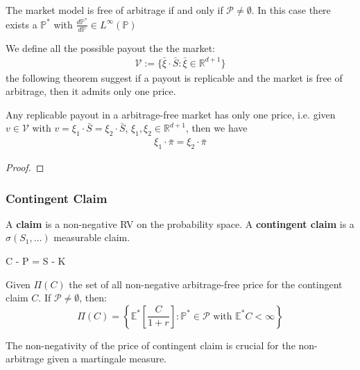\begin{theorem}
	The market model is free of arbitrage if and only if $\mathcal{P} \neq \emptyset$. In this case there exists a $\mathbb{P}^*$ with $\frac{d\mathbb{P}^*}{d\mathbb{P}} \in L^\infty(\mathbb{P})$
\end{theorem}

We define all the possible payout the the market:
\begin{align*}
	\mathcal{V}:= \{ \bar{\xi}\cdot \bar{S}: \bar{\xi} \in \mathbb{R}^{d +1}\}
\end{align*}
the following theorem suggest if a payout is replicable and the market is free of arbitrage, then it admits only one price.

\begin{theorem}
	Any replicable payout in a arbitrage-free market has only one price, i.e. given $v \in \mathcal{V}$ with $v = \xi_1 \cdot \bar{S} = \xi_2 \cdot \bar{S}$, $\xi_1, \xi_2 \in \mathbb{R}^{d +1}$, then we have
	\begin{align*}
		\xi_1 \cdot \bar{\pi}  = \xi_2  \cdot \bar{\pi}
	\end{align*}
\end{theorem}
\begin{proof}
	
\end{proof}


\subsubsection{Contingent Claim}
\begin{definition}
A \textbf{claim} is a non-negative RV on the probability space. A \textbf{contingent claim} is a $\sigma(S_1, \dots)$ measurable claim.
\end{definition}

\begin{example}
	C - P = S - K
\end{example}

\begin{theorem}
	Given $\Pi(C)$ the set of all non-negative arbitrage-free price for the contingent claim $C$. If $\mathcal{P} \neq \emptyset$, then:
	\begin{equation*}
		\Pi(C) = \left\{ \mathbb{E}^*\left[\frac{C}{1+r}\right] :  \mathbb{P}^* \in \mathcal{P} \text{ with } \mathbb{E}^*C < \infty \right\}
	\end{equation*}
\end{theorem}
\begin{remark}
The non-negativity of the price of contingent claim is crucial for the non-arbitrage given a martingale measure.
\end{remark}

